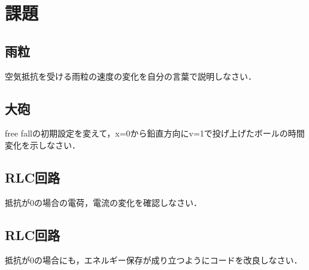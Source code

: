 \documentclass[11pt,dvipdfmx]{jsarticle}
\begin{document}
    \section{課題}\label{ux8ab2ux984c}

\subsection{雨粒}\label{ux96e8ux7c92}

空気抵抗を受ける雨粒の速度の変化を自分の言葉で説明しなさい．

\subsection{大砲}\label{ux5927ux7832}

free
fallの初期設定を変えて，x=0から鉛直方向にv=1で投げ上げたボールの時間変化を示しなさい．

\subsection{RLC回路}\label{rlcux56deux8def}

抵抗が0の場合の電荷，電流の変化を確認しなさい．

\subsection{RLC回路}\label{rlcux56deux8def-1}

抵抗が0の場合にも，エネルギー保存が成り立つようにコードを改良しなさい．


    
    
    
    
\end{document}
